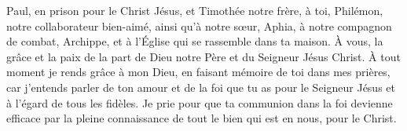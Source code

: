 Paul, en prison pour le Christ Jésus, et Timothée notre frère,
	à toi, Philémon, notre collaborateur bien-aimé,
	ainsi qu’à notre sœur, Aphia, à notre compagnon de combat, Archippe,
	et à l’Église qui se rassemble dans ta maison.
À vous, la grâce et la paix de la part de Dieu notre Père et du Seigneur Jésus Christ.
À tout moment je rends grâce à mon Dieu, en faisant mémoire de toi dans mes prières,
	car j’entends parler de ton amour et de la foi que tu as pour le Seigneur Jésus
	et à l’égard de tous les fidèles.
Je prie pour que ta communion dans la foi devienne efficace
	par la pleine connaissance de tout le bien qui est en nous, pour le Christ.
